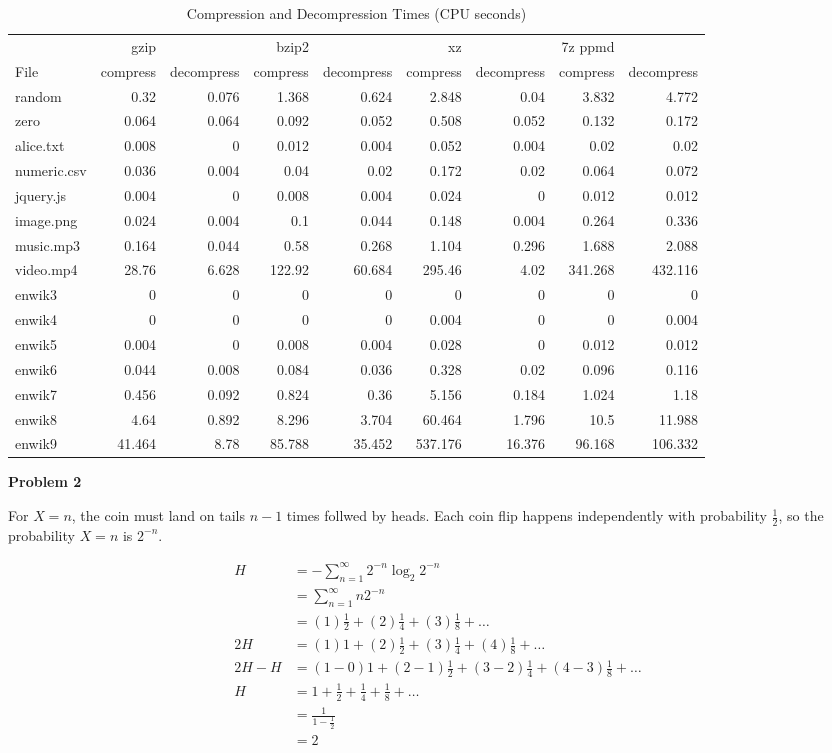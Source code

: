 \documentclass[11pt]{article}
\begin{document}
\begin{table}[h!]
\caption{Compression and Decompression Times (CPU seconds)}
\small
\begin{tabular}{| l | r r | r r | r r | r r |}
\hline
 & gzip &  & bzip2 &  & xz &  & 7z ppmd & \\
File & compress & decompress & compress & decompress & compress & decompress & compress & decompress\\
\hline
random & 0.32 & 0.076 & 1.368 & 0.624 & 2.848 & 0.04 & 3.832 & 4.772\\
zero & 0.064 & 0.064 & 0.092 & 0.052 & 0.508 & 0.052 & 0.132 & 0.172\\
\hline
alice.txt & 0.008 & 0 & 0.012 & 0.004 & 0.052 & 0.004 & 0.02 & 0.02\\
numeric.csv & 0.036 & 0.004 & 0.04 & 0.02 & 0.172 & 0.02 & 0.064 & 0.072\\
jquery.js & 0.004 & 0 & 0.008 & 0.004 & 0.024 & 0 & 0.012 & 0.012\\
image.png & 0.024 & 0.004 & 0.1 & 0.044 & 0.148 & 0.004 & 0.264 & 0.336\\
music.mp3 & 0.164 & 0.044 & 0.58 & 0.268 & 1.104 & 0.296 & 1.688 & 2.088\\
video.mp4 & 28.76 & 6.628 & 122.92 & 60.684 & 295.46 & 4.02 & 341.268 & 432.116\\
\hline
enwik3 & 0 & 0 & 0 & 0 & 0 & 0 & 0 & 0\\
enwik4 & 0 & 0 & 0 & 0 & 0.004 & 0 & 0 & 0.004\\
enwik5 & 0.004 & 0 & 0.008 & 0.004 & 0.028 & 0 & 0.012 & 0.012\\
enwik6 & 0.044 & 0.008 & 0.084 & 0.036 & 0.328 & 0.02 & 0.096 & 0.116\\
enwik7 & 0.456 & 0.092 & 0.824 & 0.36 & 5.156 & 0.184 & 1.024 & 1.18\\
enwik8 & 4.64 & 0.892 & 8.296 & 3.704 & 60.464 & 1.796 & 10.5 & 11.988\\
enwik9 & 41.464 & 8.78 & 85.788 & 35.452 & 537.176 & 16.376 & 96.168 & 106.332\\
\hline
\end{tabular}
\end{table}

\pagebreak

\noindent \textbf{Problem 2}

For $X=n$, the coin must land on tails $n-1$ times follwed by heads.
Each coin flip happens independently with probability $\frac12$, so the probability $X=n$ is $2^{-n}$.

\begin{align*}
H &= -\sum_{n=1}^\infty 2^{-n} \log_2 2^{-n}\\
&= \sum_{n=1}^\infty n 2^{-n}\\
&= (1)\frac12 + (2)\frac14 + (3)\frac18 + \dots\\
2H &= (1)1 + (2)\frac12 + (3)\frac14 + (4)\frac18 + \dots\\
2H - H &= (1-0)1 + (2-1)\frac12 + (3-2)\frac14 + (4-3)\frac18 + \dots\\
H &= 1 + \frac12 + \frac14 + \frac18 + \dots\\
&= \frac{1}{1 - \frac12}\\
&= 2
\end{align*}
\end{document}
